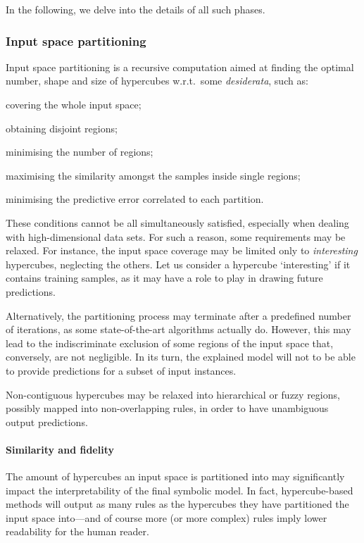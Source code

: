 \documentclass[
]{ceurart}
\begin{document}
In the following, we delve into the details of all such phases.

\subsubsection{Input space partitioning}

Input space partitioning is a recursive computation aimed at finding the optimal number, shape and size of hypercubes w.r.t.\ some \emph{desiderata}, such as:
%
\begin{inlinelist}
	\item covering the whole input space;
	\item obtaining disjoint regions;
	\item minimising the number of regions;
	\item maximising the similarity amongst the samples inside single regions;
	\item minimising the predictive error correlated to each partition.
\end{inlinelist}

These conditions cannot be all simultaneously satisfied, especially when dealing with high-dimensional data sets.
%
For such a reason, some requirements may be relaxed.
%
For instance, the input space coverage may be limited only to \emph{interesting} hypercubes, neglecting the others.
%
Let us consider a hypercube `interesting' if it contains training samples, as it may have a role to play in drawing future predictions.

Alternatively, the partitioning process may terminate after a predefined number of iterations, as some state-of-the-art algorithms actually do.
%
However, this may lead to the indiscriminate exclusion of some regions of the input space that, conversely, are not negligible.
%
In its turn, the explained model will not to be able to provide predictions for a subset of input instances.

Non-contiguous hypercubes may be relaxed into hierarchical or fuzzy regions, possibly mapped into non-overlapping rules, in order to have unambiguous output predictions.

\paragraph{Similarity and fidelity}

The amount of hypercubes an input space is partitioned into may significantly impact the interpretability of the final symbolic model.
%
In fact, hypercube-based methods will output as many rules as the hypercubes they have partitioned the input space into---and of course more (or more complex) rules imply lower readability for the human reader.
\end{document}
